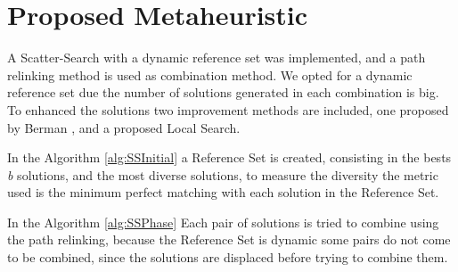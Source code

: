 \section{Proposed Metaheuristic}
A Scatter-Search
with a dynamic reference set
was implemented,
and a path relinking method
is used as combination method.
We opted for a dynamic reference set
due the number of solutions generated
in each combination is big.
To enhanced the solutions
two improvement methods are included,
one proposed by Berman \cite{berman1987stochastic},
and a proposed Local Search.


In the Algorithm \ref{alg:SSInitial}
a Reference Set is created,
consisting in the bests \textit{b} solutions,
and the most diverse  solutions,
to measure the diversity
the metric used is
the minimum perfect matching
with each solution in the Reference Set.


In the Algorithm \ref{alg:SSPhase}
Each pair  of solutions
is tried to combine
using the path relinking,
because the Reference Set is dynamic
some pairs do not come to be combined,
since the solutions
are displaced
before trying to combine them.

